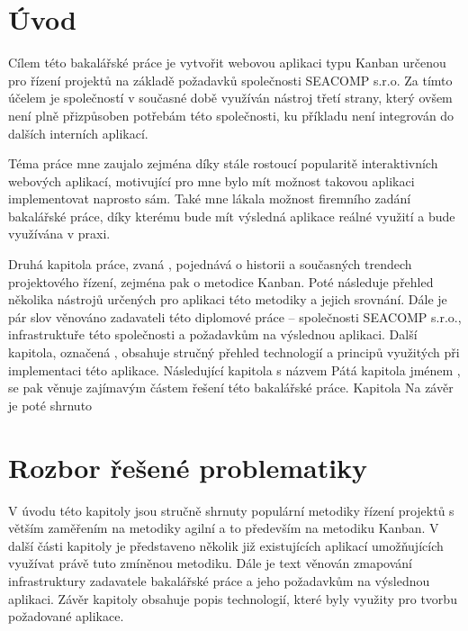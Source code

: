 \chapter{Úvod}
\blindtext

Cílem této bakalářské práce je vytvořit webovou aplikaci typu Kanban určenou pro řízení projektů na základě požadavků společnosti SEACOMP s.r.o. Za tímto účelem je společností v současné době využíván nástroj třetí strany, který ovšem není plně přizpůsoben potřebám této společnosti, ku příkladu není integrován do dalších interních aplikací.

Téma práce mne zaujalo zejména díky stále rostoucí popularitě interaktivních webových aplikací, motivující pro mne bylo mít možnost takovou aplikaci implementovat naprosto sám. Také mne lákala možnost firemního zadání bakalářské práce, díky kterému bude mít výsledná aplikace reálné využití a bude využívána v praxi. 

\blindtext

Druhá kapitola práce, zvaná , pojednává o historii a současných trendech projektového řízení, zejména pak o metodice Kanban. Poté následuje přehled několika nástrojů určených pro aplikaci této metodiky a jejich srovnání.
Dále je pár slov věnováno zadavateli této diplomové práce -- společnosti SEACOMP s.r.o., infrastruktuře této společnosti a požadavkům na výslednou aplikaci.
Další kapitola, označená , obsahuje stručný přehled technologií a principů využitých při implementaci této aplikace.
Následující kapitola s názvem  %
Pátá kapitola jménem , se pak věnuje zajímavým částem řešení této bakalářské práce. 
Kapitola  %
Na závěr je poté shrnuto %



\chapter{Rozbor řešené problematiky}
V úvodu této kapitoly jsou stručně shrnuty populární metodiky řízení projektů s větším zaměřením na metodiky agilní a to především na metodiku Kanban. V další části kapitoly je představeno několik již existujících aplikací umožňujících využívat právě tuto zmíněnou metodiku. Dále je text věnován zmapování infrastruktury zadavatele bakalářské práce a jeho požadavkům na výslednou aplikaci. Závěr kapitoly obsahuje popis technologií, které byly využity pro tvorbu požadované aplikace.

